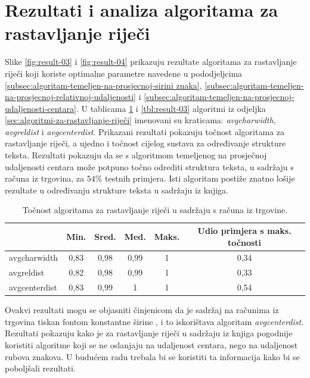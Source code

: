 \documentclass[times, utf8, zavrsni]{fer}
\begin{document}
\pagebreak







\section{Rezultati i analiza algoritama za rastavljanje riječi}
\label{sec:rezultati-i-analiza-algoritama-za-rastavljanje-rijeci}
Slike \ref{fig:result-03} i \ref{fig:result-04} prikazuju rezultate algoritama
za rastavljanje riječi koji koriste optimalne parametre navedene u
pododjeljcima \ref{subsec:algoritam-temeljen-na-prosjecnoj-sirini znaka},
\ref{subsec:algoritam-temeljen-na-prosjecnoj-relativnoj-udaljenosti} i
\ref{subsec:algoritam-temeljen-na-prosjecnoj-udaljenosti-centara}. U tablicama
\ref{tbl:result-02} i \ref{tbl:result-03} algoritmi iz odjeljka
\ref{sec:algoritmi-za-rastavljanje-riječi} imenovani su kraticama:
\emph{avgcharwidth}, \emph{avgreldist} i \emph{avgcenterdist}. Prikazani
rezultati pokazuju točnost algoritama za rastavljanje riječi, a ujedno i
točnost cijelog sustava za određivanje strukture teksta.
Rezultati pokazuju da se s algoritmom temeljenog na prosječnoj udaljenosti
centara može potpuno točno odrediti struktura teksta, u sadržaju s računa iz
trgovina, za $54\%$ testnih primjera. Isti algoritam postiže znatno lošije
rezultate u određivanju strukture teksta u sadržaju iz knjiga.

\begin{table}[htb]
\caption{Točnost algoritama za rastavljanje riječi u sadržaju s računa iz trgovine.}
\label{tbl:result-02}
\centering
\begin{tabular}{lccccc} \hline
& Min. & Sred. & Med. & Maks. & Udio primjera s maks. točnosti \\ \hline
avgcharwidth & 0,83 & 0,98 & 0,99 & 1 & 0,34 \\
avgreldist & 0,82 & 0,98 & 0,99 & 1 & 0,33 \\
avgcenterdist & 0,83 & 0,99 & 1 & 1 & 0,54 \\ \hline
\end{tabular}
\end{table}

Ovakvi rezultati
mogu se objasniti činjenicom da je sadržaj na računima iz trgovina tiskan
fontom konstantne širine , i to iskorištava algoritam
\emph{avgcenterdist}. Rezultati pokazuju kako je za rastavljanje riječi u
sadržaju iz knjiga pogodnije koristiti algoritme koji se ne oslanjaju na
udaljenost centara, nego na udaljenost rubova znakova. U budućem radu trebala
bi se koristiti ta informacija kako bi se poboljšali rezultati.
\end{document}
